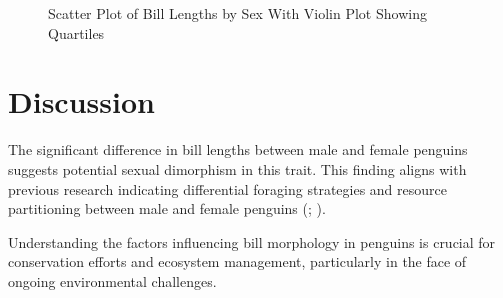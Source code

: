 \documentclass[
  man,
  longtable,
  a4paper,
  nolmodern,
  notxfonts,
  notimes,
  colorlinks=true,linkcolor=blue,citecolor=blue,urlcolor=blue]{apa7}
\begin{document}
\begin{figure}

\caption{\label{fig-bill-length-comparison}Scatter Plot of Bill Lengths
by Sex With Violin Plot Showing Quartiles}


\end{figure}%

\section{Discussion}\label{discussion}

The significant difference in bill lengths between male and female
penguins suggests potential sexual dimorphism in this trait. This
finding aligns with previous research indicating differential foraging
strategies and resource partitioning between male and female penguins
(;
).

Understanding the factors influencing bill morphology in penguins is
crucial for conservation efforts and ecosystem management, particularly
in the face of ongoing environmental challenges.
\end{document}
